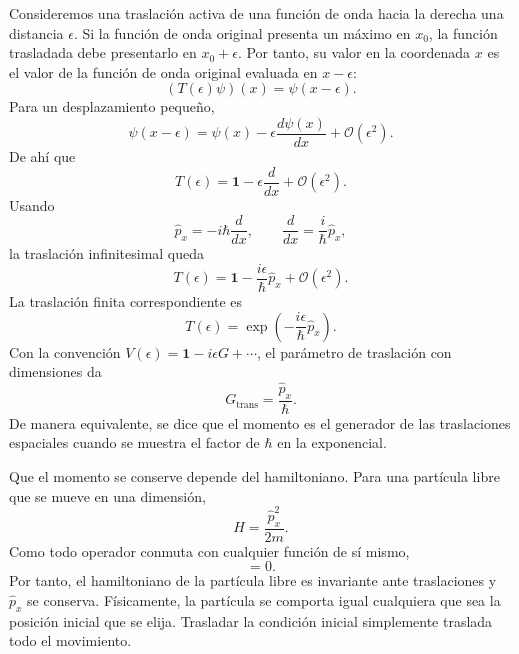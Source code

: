 Consideremos una traslación activa de una función de onda hacia la derecha una distancia \(\epsilon\). Si la función de onda original presenta un máximo en \(x_0\), la función trasladada debe presentarlo en \(x_0+\epsilon\). Por tanto, su valor en la coordenada \(x\) es el valor de la función de onda original evaluada en \(x-\epsilon\):
\begin{equation}
(T(\epsilon)\psi)(x)=\psi(x-\epsilon).
\end{equation}
Para un desplazamiento pequeño,
\begin{equation}
\psi(x-\epsilon)
=
\psi(x)-\epsilon\frac{d\psi(x)}{dx}
+\mathcal O(\epsilon^2).
\end{equation}
De ahí que
\begin{equation}
T(\epsilon)
=
\mathbf 1-\epsilon\frac{d}{dx}
+\mathcal O(\epsilon^2).
\end{equation}
Usando
\begin{equation}
\hat p_x=-i\hbar\frac{d}{dx},
\qquad
\frac{d}{dx}=\frac{i}{\hbar}\hat p_x,
\end{equation}
la traslación infinitesimal queda
\begin{equation}
T(\epsilon)
=
\mathbf 1-\frac{i\epsilon}{\hbar}\hat p_x
+\mathcal O(\epsilon^2).
\end{equation}
La traslación finita correspondiente es
\begin{equation}
T(\epsilon)
=
\exp\left(-\frac{i\epsilon}{\hbar}\hat p_x\right).
\end{equation}
Con la convención \(V(\epsilon)=\mathbf 1-i\epsilon G+\cdots\), el parámetro de traslación con dimensiones da
\begin{equation}
G_{\mathrm{trans}}=\frac{\hat p_x}{\hbar}.
\end{equation}
De manera equivalente, se dice que el momento es el generador de las traslaciones espaciales cuando se muestra el factor de \(\hbar\) en la exponencial.

\begin{classroomqa}
\end{classroomqa}

Que el momento se conserve depende del hamiltoniano. Para una partícula libre que se mueve en una dimensión,
\begin{equation}
H=\frac{\hat p_x^2}{2m}.
\end{equation}
Como todo operador conmuta con cualquier función de sí mismo,
\begin{equation}
[H,\hat p_x]=0.
\end{equation}
Por tanto, el hamiltoniano de la partícula libre es invariante ante traslaciones y \(\hat p_x\) se conserva. Físicamente, la partícula se comporta igual cualquiera que sea la posición inicial que se elija. Trasladar la condición inicial simplemente traslada todo el movimiento.

